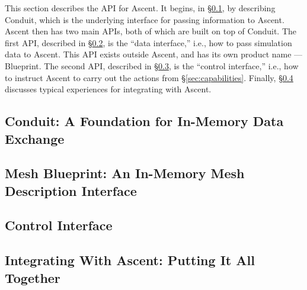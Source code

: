 This section describes the API for Ascent.
%
It begins, in \S\ref{Conduit}, by describing Conduit, which is the underlying
interface for passing information to Ascent.
%
Ascent then has two main APIs, both of which are built on top of Conduit.
%
%
The first API, described in \S\ref{Blueprint}, is the ``data interface,'' i.e., how
to pass simulation data to Ascent.
%
This API exists outside Ascent, and has its own product name --- Blueprint.
%
The second API, described in \S\ref{ascent_control}, is the ``control interface,''
i.e., how to instruct Ascent to carry out the actions from \S\ref{sec:capabilities}.
%
Finally, \S\ref{api_summary} discusses typical experiences for integrating with Ascent.

\subsection{Conduit: A Foundation for In-Memory Data Exchange}
\label{Conduit}


\subsection{Mesh Blueprint: An In-Memory Mesh Description Interface}
\label{Blueprint}


\subsection{Control Interface}
\label{ascent_control}


\subsection{Integrating With Ascent: Putting It All Together}
\label{api_summary}



